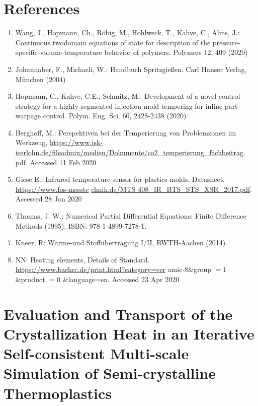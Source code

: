 \documentclass[10pt]{article}
\begin{document}
\section*{References}
\begin{enumerate}
  \item Wang, J., Hopmann, Ch., Röbig, M., Hohlweck, T., Kahve, C., Alms, J.: Continuous twodomain equations of state for description of the pressure-specific-volume-temperature behavior of polymers. Polymers 12, 409 (2020)

  \item Johannaber, F., Michaeli, W.: Handbuch Spritzgießen. Carl Hanser Verlag, München (2004)

  \item Hopmann, C., Kahve, C.E., Schmitz, M.: Development of a novel control strategy for a highly segmented injection mold tempering for inline part warpage control. Polym. Eng. Sci. 60, 2428-2438 (2020)

  \item Berghoff, M.: Perspektiven bei der Temperierung von Problemzonen im Werkzeug, \href{https://www.isk-iserlohn.de/fileadmin/medien/Dokumente/co2_temperierung_fachbeitrag}{https://www.isk-iserlohn.de/fileadmin/medien/Dokumente/co2\_temperierung\_fachbeitrag}. pdf. Accessed 11 Feb 2020

  \item Giese E.: Infrared temperature sensor for plastics molds, Datasheet. \href{https://www.fos-messte}{https://www.fos-messte} \href{http://chnik.de/MTS%20408_IR_BTS_STS_XSR_2017.pdf}{chnik.de/MTS 408\_IR\_BTS\_STS\_XSR\_2017.pdf}. Accessed 28 Jan 2020

  \item Thomas, J. W.: Numerical Partial Differential Equations: Finite Difference Methods (1995). ISBN: 978-1-4899-7278-1.

  \item Kneer, R: Wärme-und Stoffübertragung I/II, RWTH-Aachen (2014)

  \item NN: Heating elements, Details of Standard. \href{https://www.bachrc.de/print.html?category=cer}{https://www.bachrc.de/print.html?category=cer} amic-8\&group $=1$ \&product $=0$ \&language=en. Accessed 23 Apr 2020

\end{enumerate}

\section*{Evaluation and Transport of the Crystallization Heat in an Iterative Self-consistent Multi-scale Simulation of Semi-crystalline Thermoplastics }
\end{document}
